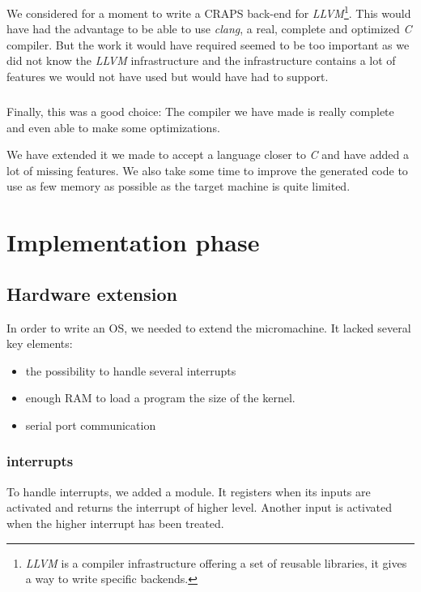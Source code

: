 \documentclass[openany, a4paper]{book}
\begin{document}
        We considered for a moment to write a CRAPS back-end for
        \emph{LLVM}\footnote{\emph{LLVM} is a compiler infrastructure
        offering a set of reusable libraries, it gives a way to write specific
        backends.\cite{llvm}}. This would have had the advantage to be able to
        use \emph{clang}, a real, complete and optimized \emph{C} compiler. But
        the work it would have required seemed to be too important as we did
        not know the \emph{LLVM} infrastructure and the infrastructure contains
        a lot of features we would not have used but would have had to
        support.

        \paragraph{}
        Finally, this was a good choice: The compiler we have made is really
        complete and even able to make some optimizations.

        We have extended it we made to accept a language closer to \emph{C} and
        have added a lot of missing features. We also take some time to improve
        the generated code to use as few memory as possible as the target
        machine is quite limited.

  \chapter{Implementation phase}
    \section{Hardware extension}
        In order to write an OS, we needed to extend the micromachine.
        It lacked several key elements:
        \begin{itemize}
            \item the possibility to handle several interrupts
            \item enough RAM to load a program the size of the kernel.
            \item serial port communication
        \end{itemize}
        \subsection{interrupts}
            To handle interrupts, we added a module. It registers when its
            inputs are activated and returns the interrupt of higher level.
            Another input is activated when the higher interrupt has been
            treated.
\end{document}

